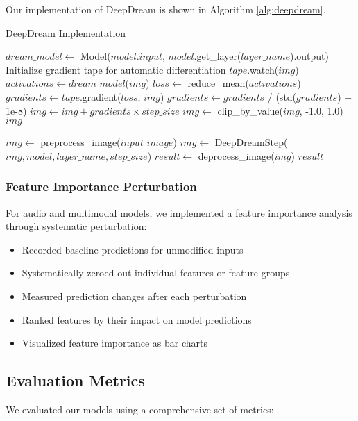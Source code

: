 \documentclass[conference,compsoc]{IEEEtran}
\begin{document}
Our implementation of DeepDream is shown in Algorithm \ref{alg:deepdream}.

\begin{algorithm}
\caption{DeepDream Implementation}
\label{alg:deepdream}
\begin{algorithmic}[1]
    \State $dream\_model \gets$ Model($model.input$, $model$.get\_layer($layer\_name$).output)
    \State Initialize gradient tape for automatic differentiation
    \State $tape$.watch($img$)
    \State $activations \gets dream\_model$($img$)
    \State $loss \gets$ reduce\_mean($activations$)
    \State $gradients \gets tape$.gradient($loss$, $img$)
    \State $gradients \gets gradients$ / (std($gradients$) + 1e-8)
    \State $img \gets img + gradients \times step\_size$
    \State $img \gets$ clip\_by\_value($img$, -1.0, 1.0)
    \State \Return $img$
\EndFunction

    \State $img \gets$ preprocess\_image($input\_image$)
        \State $img \gets$ DeepDreamStep($img, model, layer\_name, step\_size$)
    \EndFor
    \State $result \gets$ deprocess\_image($img$)
    \State \Return $result$
\EndFunction
\end{algorithmic}
\end{algorithm}

\FloatBarrier

\subsubsection{Feature Importance Perturbation}
For audio and multimodal models, we implemented a feature importance analysis through systematic perturbation:
\begin{itemize}
    \item Recorded baseline predictions for unmodified inputs
    \item Systematically zeroed out individual features or feature groups
    \item Measured prediction changes after each perturbation
    \item Ranked features by their impact on model predictions
    \item Visualized feature importance as bar charts
\end{itemize}

\subsection{Evaluation Metrics}
We evaluated our models using a comprehensive set of metrics:
\end{document}
